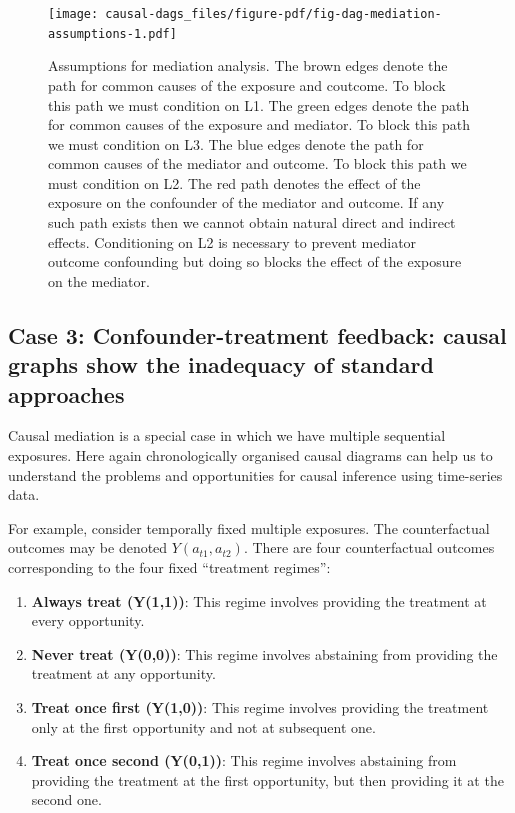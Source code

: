 \documentclass[
  singlecolumn]{report}
\begin{document}
\begin{figure}

{\centering \texttt{[image: causal-dags\_files/figure-pdf/fig-dag-mediation-assumptions-1.pdf]}

}

\caption{\label{fig-dag-mediation-assumptions}Assumptions for mediation
analysis. The brown edges denote the path for common causes of the
exposure and coutcome. To block this path we must condition on L1. The
green edges denote the path for common causes of the exposure and
mediator. To block this path we must condition on L3. The blue edges
denote the path for common causes of the mediator and outcome. To block
this path we must condition on L2. The red path denotes the effect of
the exposure on the confounder of the mediator and outcome. If any such
path exists then we cannot obtain natural direct and indirect effects.
Conditioning on L2 is necessary to prevent mediator outcome confounding
but doing so blocks the effect of the exposure on the mediator.}

\end{figure}

\hypertarget{case-3-confounder-treatment-feedback-causal-graphs-show-the-inadequacy-of-standard-approaches}{%
\subsection{Case 3: Confounder-treatment feedback: causal graphs show
the inadequacy of standard
approaches}\label{case-3-confounder-treatment-feedback-causal-graphs-show-the-inadequacy-of-standard-approaches}}

Causal mediation is a special case in which we have multiple sequential
exposures. Here again chronologically organised causal diagrams can help
us to understand the problems and opportunities for causal inference
using time-series data.

For example, consider temporally fixed multiple exposures. The
counterfactual outcomes may be denoted \(Y(a_{t1} ,a_{t2})\). There are
four counterfactual outcomes corresponding to the four fixed ``treatment
regimes'':

\begin{enumerate}
\def\labelenumi{\arabic{enumi}.}
\item
  \textbf{Always treat (Y(1,1))}: This regime involves providing the
  treatment at every opportunity.
\item
  \textbf{Never treat (Y(0,0))}: This regime involves abstaining from
  providing the treatment at any opportunity.
\item
  \textbf{Treat once first (Y(1,0))}: This regime involves providing the
  treatment only at the first opportunity and not at subsequent one.
\item
  \textbf{Treat once second (Y(0,1))}: This regime involves abstaining
  from providing the treatment at the first opportunity, but then
  providing it at the second one.
\end{enumerate}
\end{document}

